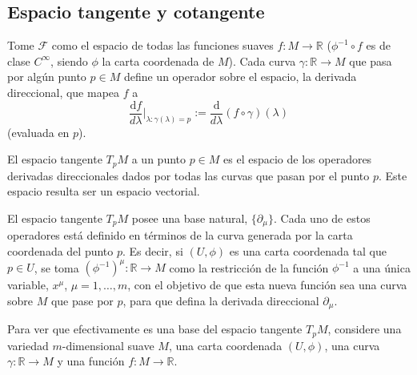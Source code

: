 \subsection{Espacio tangente y cotangente}
Tome $\mathcal{F}$ como el espacio de todas las funciones suaves $f:M\rightarrow\mathbb{R}$ ($\phi^{-1}\circ f$ es de clase $C^\infty$, siendo $\phi$ la carta coordenada de $M$). Cada curva $\gamma:\mathbb{R}\rightarrow M$ que pasa por algún punto $p\in M$ define un operador sobre el espacio, la derivada direccional, que mapea $f$ a $$\frac{\mathrm{d}f}{d\lambda}\Big|_{\lambda: \gamma(\lambda)=p}:=\frac{\mathrm{d}}{d\lambda}(f\circ\gamma)(\lambda)$$ (evaluada en $p$).
\begin{center}
\end{center}
\begin{defi}
	El espacio tangente $T_pM$ a un punto $p\in M$ es el espacio de los operadores derivadas direccionales dados por todas las curvas que pasan por el punto $p$. Este espacio resulta ser un espacio vectorial.
\end{defi}
El espacio tangente $T_pM$ posee una base natural, $\{\partial_\mu\}$. Cada uno de estos operadores está definido en términos de la curva generada por la carta coordenada del punto $p$. Es decir, si $(U,\phi)$ es una carta coordenada tal que $p\in U$, se toma $(\phi^{-1})^\mu:\mathbb{R}\rightarrow M$ como la restricción de la función $\phi^{-1}$ a una única variable, $x^\mu$, $\mu=1,\dots,m$, con el objetivo de que esta nueva función sea una curva sobre $M$ que pase por $p$, para que defina la derivada direccional $\partial_\mu.$

Para ver que efectivamente es una base del espacio tangente $T_pM$, considere una variedad $m$-dimensional suave $M$, una carta coordenada $(U,\phi)$, una curva $\gamma:\mathbb{R}\rightarrow M$ y una función $f: M\rightarrow \mathbb{R}$.

